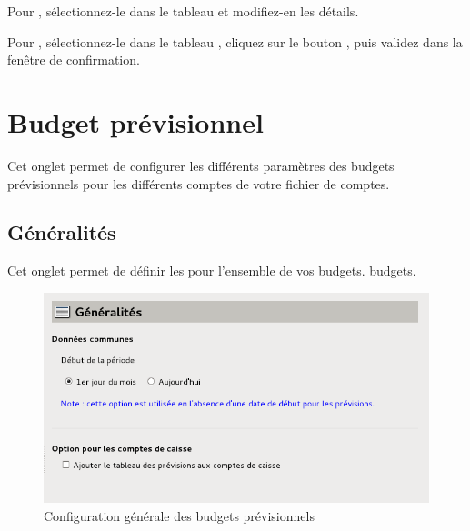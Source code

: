 \ifIllustration
\else
\fi

Pour , sélectionnez-le dans le tableau  et modifiez-en les détails.

Pour , sélectionnez-le dans le tableau  , cliquez sur le bouton , puis validez dans la fenêtre de confirmation.



\section{Budget prévisionnel\label{setup-budget}}


Cet onglet permet de configurer les différents paramètres des budgets prévisionnels pour les différents comptes de votre fichier de comptes.


\subsection{Généralités\label{setup-budget-general}}

Cet onglet permet de définir les  pour l'ensemble de vos \ifIllustration  budgets.
\else budgets. 
\fi

\ifIllustration
\begin{figure}[h!]
\begin{center}
\includegraphics[scale=0.5]{image/screenshot/setup_budget_general}
\end{center}
\caption{Configuration générale des budgets prévisionnels}
\label{setup-budgetGeneral-img}
\end{figure}
\fi

